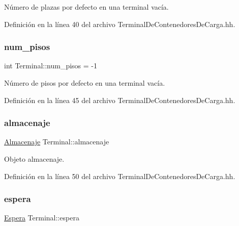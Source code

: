 Número de plazas por defecto en una terminal vacía. 



Definición en la línea 40 del archivo Terminal\+De\+Contenedores\+De\+Carga.\+hh.

\mbox{\label{class_terminal_ad6cdee7fe26b4443d45b0a18c345a86d}} 
\subsubsection{\texorpdfstring{num\+\_\+pisos}{num\_pisos}}
{\footnotesize\ttfamily int Terminal\+::num\+\_\+pisos = -\/1\hspace{0.3cm}{\ttfamily [private]}}



Número de pisos por defecto en una terminal vacía. 



Definición en la línea 45 del archivo Terminal\+De\+Contenedores\+De\+Carga.\+hh.

\mbox{\label{class_terminal_a1d87d7b16c4f460eee6f1ab73da90fd2}} 
\subsubsection{\texorpdfstring{almacenaje}{almacenaje}}
{\footnotesize\ttfamily \hyperlink{class_almacenaje}{Almacenaje} Terminal\+::almacenaje\hspace{0.3cm}{\ttfamily [private]}}



Objeto almacenaje. 



Definición en la línea 50 del archivo Terminal\+De\+Contenedores\+De\+Carga.\+hh.

\mbox{\label{class_terminal_ac9f71207d73c8d05a9d9d6c046f9f8c3}} 
\subsubsection{\texorpdfstring{espera}{espera}}
{\footnotesize\ttfamily \hyperlink{class_espera}{Espera} Terminal\+::espera\hspace{0.3cm}{\ttfamily [private]}}



